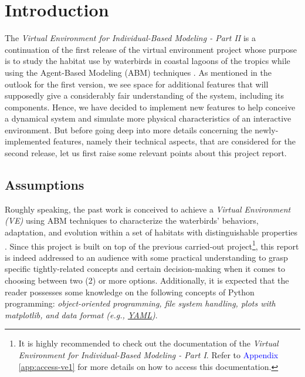 %
%
%


\section{Introduction}
The \emph{Virtual Environment for Individual-Based Modeling - Part II} is a continuation of the first release of the virtual environment project whose purpose is to study the habitat use by waterbirds in coastal lagoons of the tropics while using the Agent-Based Modeling (ABM) techniques \cite{rflorent2019veibm1}. As mentioned in the outlook for the first version, we see space for additional features that will supposedly give a considerably fair understanding of the system, including its components. Hence, we have decided to implement new features to help conceive a dynamical system and simulate more physical characteristics of an interactive environment. But before going deep into more details concerning the newly-implemented features, namely their technical aspects, that are considered for the second release, let us first raise some relevant points about this project report.

\subsection{Assumptions}
Roughly speaking, the past work is conceived to achieve a \emph{Virtual Environment (VE)} using ABM techniques to characterize the waterbirds' behaviors, adaptation, and evolution within a set of habitats with distinguishable properties \cite{rflorent2019veibm1}.  Since this project is built on top of the previous carried-out project\footnote{It is highly recommended to check out the documentation of the \emph{Virtual Environment for Individual-Based Modeling - Part I}. Refer to \textcolor{blue}{Appendix} \ref{app:access-ve1} for more details on how to access this documentation.}, this report is indeed addressed to an audience with some practical understanding to grasp specific tightly-related concepts and certain decision-making when it comes to choosing between two (2) or more options. Additionally, it is expected that the reader possesses some knowledge on the following concepts of Python\cite{python} programming: \emph{object-oriented programming, file system handling, plots with matplotlib\cite{matplotlib.pyplot, matplotlib.patches, matplotlib.path}, and data format (e.g., \href{https://yaml.org/}{YAML})}.


